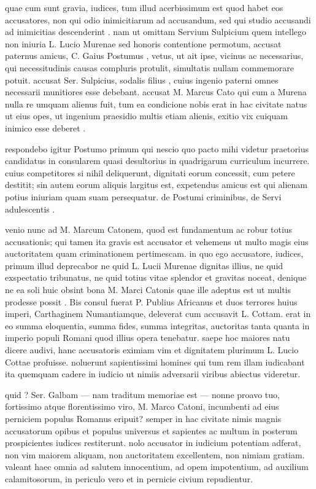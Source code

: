  quae cum sunt gravia, iudices, tum illud acerbissimum est quod habet eos accusatores, non qui odio inimicitiarum ad accusandum, sed qui studio accusandi ad inimicitias descenderint . nam ut omittam Servium Sulpicium quem intellego non iniuria L. Lucio Murenae sed honoris contentione permotum, accusat paternus amicus, C. Gaius Postumus , vetus, ut ait ipse, vicinus ac necessarius, qui necessitudinis causas compluris protulit, simultatis nullam commemorare potuit. accusat Ser. Sulpicius, sodalis filius , cuius ingenio paterni omnes necessarii munitiores esse debebant. accusat M. Marcus Cato qui cum a Murena nulla re umquam alienus fuit, tum ea condicione nobis erat in hac civitate natus ut eius opes, ut ingenium praesidio multis etiam alienis, exitio vix cuiquam inimico esse deberet .

 respondebo igitur Postumo primum qui nescio quo pacto mihi videtur praetorius candidatus in consularem quasi desultorius in quadrigarum curriculum incurrere. cuius competitores si nihil deliquerunt, dignitati eorum concessit, cum petere destitit; sin autem eorum aliquis largitus est, expetendus amicus est qui alienam potius iniuriam quam suam persequatur. de Postumi criminibus, de Servi adulescentis .

 venio nunc ad M. Marcum Catonem, quod est fundamentum ac robur totius accusationis; qui tamen ita gravis est accusator et vehemens ut multo magis eius auctoritatem quam criminationem pertimescam. in quo ego accusatore, iudices, primum illud deprecabor ne quid L. Lucii Murenae dignitas illius, ne quid exspectatio tribunatus, ne quid totius vitae splendor et gravitas noceat, denique ne ea soli huic obsint bona M. Marci Catonis quae ille adeptus est ut multis prodesse possit . Bis consul fuerat P. Publius Africanus et duos terrores huius imperi, Carthaginem Numantiamque, deleverat cum accusavit L. Cottam. erat in eo summa eloquentia, summa fides, summa integritas, auctoritas tanta quanta in imperio populi Romani quod illius opera tenebatur. saepe hoc maiores natu dicere audivi, hanc accusatoris eximiam vim et dignitatem plurimum L. Lucio Cottae profuisse. noluerunt sapientissimi homines qui tum rem illam iudicabant ita quemquam cadere in iudicio ut nimiis adversarii viribus abiectus videretur.

 quid ? Ser. Galbam — nam traditum memoriae est — nonne proavo tuo, fortissimo atque florentissimo viro, M. Marco Catoni, incumbenti ad eius perniciem populus Romanus eripuit? semper in hac civitate nimis magnis accusatorum opibus et populus universus et sapientes ac multum in posterum prospicientes iudices restiterunt. nolo accusator in iudicium potentiam adferat, non vim maiorem aliquam, non auctoritatem excellentem, non nimiam gratiam. valeant haec omnia ad salutem innocentium, ad opem impotentium, ad auxilium calamitosorum, in periculo vero et in pernicie civium repudientur.

